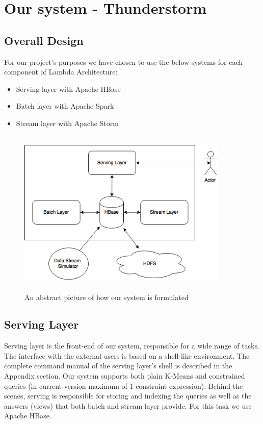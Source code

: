 \documentclass{lmproj}
\begin{document}
\chapter{Our system - Thunderstorm}
\label{systemdescr}

\section{Overall Design}
\label{systemdescr}

For our project's purposes we have chosen to use the below systems for each component of Lambda Architecture:

\begin{itemize}
	\item Serving layer with Apache HBase
	\item Batch layer with Apache Spark
	\item Stream layer with Apache Storm
\end{itemize}

\begin{figure}[h]
\centering
\includegraphics[width=10cm, height=8cm]{system}
\caption{An abstract picture of how our system is formulated}
\end{figure}


\section{Serving Layer}
\label{systemdescr}


Serving layer is the front-end of our system, responsible for a wide range of tasks. The interface with the external users is based on a shell-like environment. The complete command manual of the serving layer's shell is described in the Appendix section. Our system supports both plain K-Means and constrained queries (in current version maximum of 1 constraint expression). Behind the scenes, serving is responsible for storing and indexing the queries as well as the answers (views) that both batch and stream layer provide. For this task we use Apache HBase.
\end{document}

